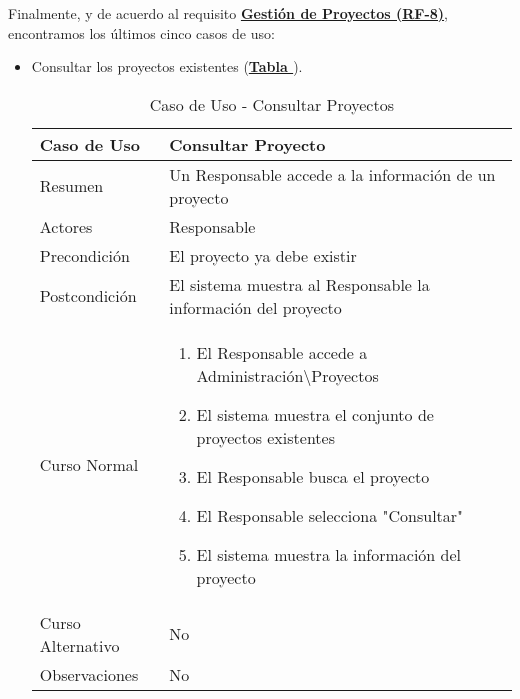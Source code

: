 \addtocounter{tabla}{1}
Finalmente, y de acuerdo al requisito \textbf{\hyperref[tab:rfGestProyectos]{Gestión de Proyectos (RF-8)}}, encontramos los últimos cinco casos de uso:
\begin{itemize}
	\item \addtocounter{tabla}{1} Consultar los proyectos existentes (\textbf{\hyperref[tab:curConsultarProyectos]{Tabla }}).
		\begin{table}[!htbp]
		  \centering  \addtocounter{casouso}{1}
		  \begin{tabular}{|l | p{100mm}|}
		    \textbf{Caso de Uso}  & \textbf{Consultar Proyecto} \\ \hline
		    Resumen 		 & Un Responsable accede a la información de un proyecto \\ \hline
		    Actores  		 & Responsable \\ \hline
		    Precondición  	 & El proyecto ya debe existir \\ \hline
		    Postcondición  	 & El sistema muestra al Responsable la información del proyecto \\ \hline
		    Curso Normal   	 & \begin{enumerate}
			  \item El Responsable accede a Administración\textbackslash Proyectos
			  \item El sistema muestra el conjunto de proyectos existentes
			  \item El Responsable busca el proyecto
			  \item El Responsable selecciona "Consultar"
			  \item El sistema muestra la información del proyecto
		    \end{enumerate}  \\ \hline
		    Curso Alternativo  & No  \\ \hline
		    Observaciones 	 & No  \\ \hline
		  \end{tabular}
		  \caption{Caso de Uso  - Consultar Proyectos}
		  \label{tab:curConsultarProyectos}
		\end{table}
		\FloatBarrier
		

\end{itemize}
